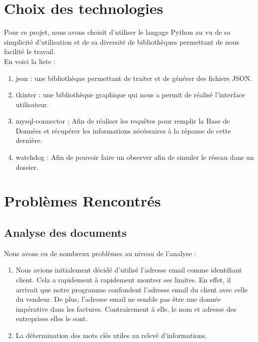\documentclass[a4paper, 11pt]{article}
\begin{document}
\section{Choix des technologies}
    Pour ce projet, nous avons choisit d'utiliser le langage Python au vu de sa simplicité d'utilisation et de sa diversité de bibliothèques permettant de nous facilité le travail.\\
    En voici la liste :
    \begin{enumerate}
        \item json : une bibliothèque permettant de traiter et de générer des fichiers JSON.
        \item tkinter : une bibliothèque graphique qui nous a permit de réalisé l'interface utilisateur.
        \item mysql-connector : Afin de réaliser les requêtes pour remplir la Base de Données et récupérer les informations nécéssaires à la réponse de cette dernière.
        \item watchdog : Afin de pouvoir faire un observer afin de simuler le réseau dans un dossier.
    \end{enumerate}


\section{Problèmes Rencontrés}
    \subsection{Analyse des documents}
    Nous avons eu de nombreux problèmes au niveau de l'analyse :
    \begin{enumerate}
        \item Nous avions initialement décidé d'utilisé l'adresse email comme identifiant client. Cela a rapidement à rapidement montrer ses limites. En effet, il arrivait que notre programme confondent l'adresse email du client avec celle du vendeur. De plus, l'adresse email ne semble pas être une donnée impérative dans les factures. Contrairement à elle, le nom et adresse des entreprises elles le sont.
        \item La détermination des mots clés utiles au relevé d'informations.
    \end{enumerate}
\end{document}

